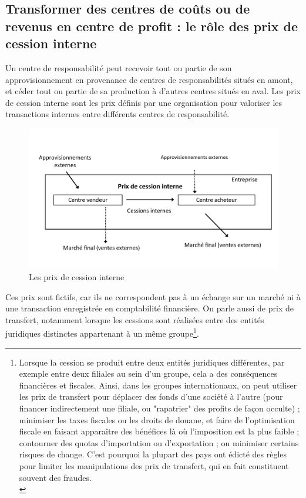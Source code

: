 \documentclass{tufte-handout}
\begin{document}
\subsection{Transformer des centres de coûts ou de revenus en centre de profit : le rôle des prix de cession interne}
\label{sec:org82a1c5a}
Un centre de responsabilité peut recevoir tout ou partie de son approvisionnement en provenance de centres de responsabilités situés en amont, et céder tout ou partie de sa production à d’autres centres situés en aval. Les prix de cession interne sont les prix définis par une organisation pour valoriser les transactions internes entre différents centres de responsabilité.\\
\begin{figure}[htbp]
\centering
\includegraphics[width=.9\linewidth]{./img/pci.pdf}
\caption{Les prix de cession interne}
\end{figure}
Ces prix sont fictifs, car ils ne correspondent pas à un échange sur un marché ni à une transaction enregistrée en comptabilité financière. On parle aussi de prix de transfert, notamment lorsque les cessions sont réalisées entre des entités juridiques distinctes appartenant à un même groupe\footnote{Lorsque la cession se produit entre deux entités juridiques différentes, par exemple entre deux filiales au sein d’un groupe, cela a des conséquences financières et fiscales. Ainsi, dans les groupes internationaux, on peut utiliser les prix de transfert pour déplacer des fonds d’une société à l’autre (pour financer indirectement une filiale, ou "rapatrier" des profits de façon occulte) ; minimiser les taxes fiscales ou les droits de douane, et faire de l’optimisation fiscale en faisant apparaître des bénéfices là où l’imposition est la plus faible ; contourner des quotas d’importation ou d’exportation ; ou minimiser certains risques de change. C’est pourquoi la plupart des pays ont édicté des règles pour limiter les manipulations des prix de transfert, qui en fait constituent souvent des fraudes.\\}.\\
\end{document}
